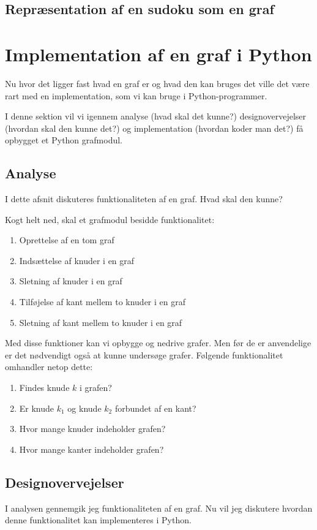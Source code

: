 \documentclass[10pt,a4paper,danish]{article}
\begin{document}
\subsection{Repræsentation af en sudoku som en graf}


\section{Implementation af en graf i Python}
Nu hvor det ligger fast hvad en graf er og hvad den kan bruges det
ville det være rart med en implementation, som vi kan bruge i
Python-programmer.

I denne sektion vil vi igennem analyse (hvad skal det kunne?)
designovervejelser (hvordan skal den kunne det?) og implementation
(hvordan koder man det?) få opbygget et Python grafmodul.

\subsection{Analyse}
\label{sec:analyse}
I dette afsnit diskuteres funktionaliteten af en graf. Hvad skal den
kunne?

Kogt helt ned, skal et grafmodul besidde funktionalitet:
\begin{enumerate}
\item Oprettelse af en tom graf
\item Indsættelse af knuder i en graf
\item Sletning af knuder i en graf
\item Tilføjelse af kant mellem to knuder i en graf
\item Sletning af kant mellem to knuder i en graf
\end{enumerate}

Med disse funktioner kan vi opbygge og nedrive grafer. Men før de er
anvendelige er det nødvendigt også at kunne undersøge grafer. Følgende
funktionalitet omhandler netop dette:
\begin{enumerate}
\item Findes knude $k$ i grafen?
\item Er knude $k_1$ og knude $k_2$ forbundet af en kant?
\item Hvor mange knuder indeholder grafen?
\item Hvor mange kanter indeholder grafen?
\end{enumerate}


\subsection{Designovervejelser}
I analysen  gennemgik jeg funktionaliteten af en
graf. Nu vil jeg diskutere hvordan denne funktionalitet kan
implementeres i Python.
\end{document}

